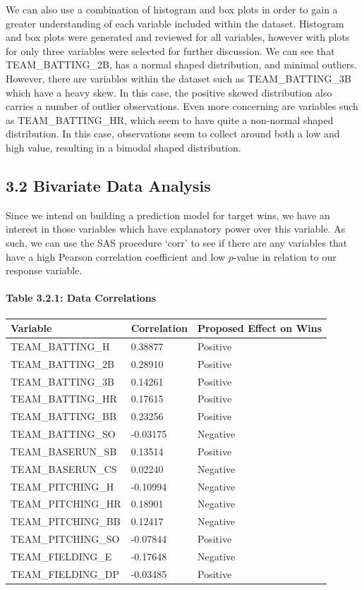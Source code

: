 \documentclass[]{article}
\let\oldparagraph\paragraph
\renewcommand{\paragraph}[1]{\oldparagraph{#1}\mbox{}}
\begin{document}
\newpage

We can also use a combination of histogram and box plots in order to
gain a greater understanding of each variable included within the
dataset. Histogram and box plots were generated and reviewed for all
variables, however with plots for only three variables were selected for
further discussion. We can see that TEAM\_BATTING\_2B, has a normal
shaped distribution, and minimal outliers. However, there are variables
within the dataset such as TEAM\_BATTING\_3B which have a heavy skew. In
this case, the positive skewed distribution also carries a number of
outlier observations. Even more concerning are variables such as
TEAM\_BATTING\_HR, which seem to have quite a non-normal shaped
distribution. In this case, observations seem to collect around both a
low and high value, resulting in a bimodal shaped distribution.

\subsection{3.2 Bivariate Data Analysis}\label{bivariate-data-analysis}

Since we intend on building a prediction model for target wins, we have
an interest in those variables which have explanatory power over this
variable. As such, we can use the SAS procedure `corr' to see if there
are any variables that have a high Pearson correlation coefficient and
low \(p\)-value in relation to our response variable.

\paragraph{Table 3.2.1: Data
Correlations}\label{table-3.2.1-data-correlations}

\begin{longtable}[]{@{}lll@{}}
\toprule
Variable & Correlation & Proposed Effect on Wins\tabularnewline
\midrule
\endhead
TEAM\_BATTING\_H & 0.38877 & Positive\tabularnewline
TEAM\_BATTING\_2B & 0.28910 & Positive\tabularnewline
TEAM\_BATTING\_3B & 0.14261 & Positive\tabularnewline
TEAM\_BATTING\_HR & 0.17615 & Positive\tabularnewline
TEAM\_BATTING\_BB & 0.23256 & Positive\tabularnewline
TEAM\_BATTING\_SO & -0.03175 & Negative\tabularnewline
TEAM\_BASERUN\_SB & 0.13514 & Positive\tabularnewline
TEAM\_BASERUN\_CS & 0.02240 & Negative\tabularnewline
TEAM\_PITCHING\_H & -0.10994 & Negative\tabularnewline
TEAM\_PITCHING\_HR & 0.18901 & Negative\tabularnewline
TEAM\_PITCHING\_BB & 0.12417 & Negative\tabularnewline
TEAM\_PITCHING\_SO & -0.07844 & Positive\tabularnewline
TEAM\_FIELDING\_E & -0.17648 & Negative\tabularnewline
TEAM\_FIELDING\_DP & -0.03485 & Positive\tabularnewline
\bottomrule
\end{longtable}
\end{document}
